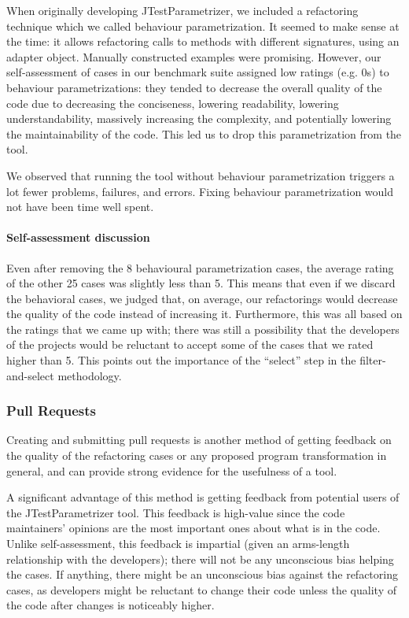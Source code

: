 When originally developing JTestParametrizer, we included a refactoring technique which we called behaviour parametrization. It seemed to make sense at the time: it allows refactoring calls to methods with different signatures, using an adapter object. Manually constructed examples were promising. However, our self-assessment of cases in our benchmark suite assigned low ratings (e.g. 0s) to behaviour parametrizations: they tended to decrease the overall quality of the code due to decreasing the conciseness, lowering readability, lowering understandability, massively increasing the complexity, and potentially lowering the maintainability of the code. This led us to drop this parametrization from the tool.

We observed that running the tool without behaviour parametrization triggers a lot fewer problems, failures, and errors. Fixing behaviour parametrization would not have been time well spent.


\paragraph{Self-assessment discussion}
Even after removing the 8 behavioural parametrization  cases, the average rating of the other 25 cases was slightly less than 5. This means that even if we discard the behavioral cases, we judged that, on average, our refactorings would decrease the quality of the code instead of increasing it. Furthermore, this was all based on the ratings that we came up with; there was still a possibility that the developers of the projects would be reluctant to accept some of the cases that we rated higher than 5. This points out the importance of the ``select'' step in the filter-and-select methodology.

\subsubsection{Pull Requests}

Creating and submitting pull requests is another method of getting feedback on the quality of the refactoring cases or any proposed program transformation in general, and can provide strong evidence for the usefulness of a tool.

A significant advantage of this method is getting feedback from potential users of the JTestParametrizer tool. This feedback is high-value since the code maintainers' opinions are the most important ones about what is in the code. Unlike self-assessment, this feedback is impartial (given an arms-length relationship with the developers); there will not be any unconscious bias helping the cases. If anything, there might be an unconscious bias against the refactoring cases, as developers might be reluctant to change their code unless the quality of the code after changes is noticeably higher.

